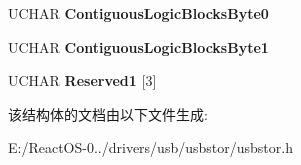 \begin{DoxyCompactItemize}
\item 
\mbox{\label{struct_u_f_i___r_e_a_d___w_r_i_t_e___c_m_d_a1c71f28e7bfe1efe34d80e038824daa0}} 
U\+C\+H\+AR {\bfseries Contiguous\+Logic\+Blocks\+Byte0}
\item 
\mbox{\label{struct_u_f_i___r_e_a_d___w_r_i_t_e___c_m_d_abe452cc01de89d40a9349d15c935dc0f}} 
U\+C\+H\+AR {\bfseries Contiguous\+Logic\+Blocks\+Byte1}
\item 
\mbox{\label{struct_u_f_i___r_e_a_d___w_r_i_t_e___c_m_d_a7a2628611815a1504792f935f3865cec}} 
U\+C\+H\+AR {\bfseries Reserved1} \mbox{[}3\mbox{]}
\end{DoxyCompactItemize}


该结构体的文档由以下文件生成\+:\begin{DoxyCompactItemize}
\item 
E\+:/\+React\+O\+S-\/0../drivers/usb/usbstor/usbstor.\+h\end{DoxyCompactItemize}
